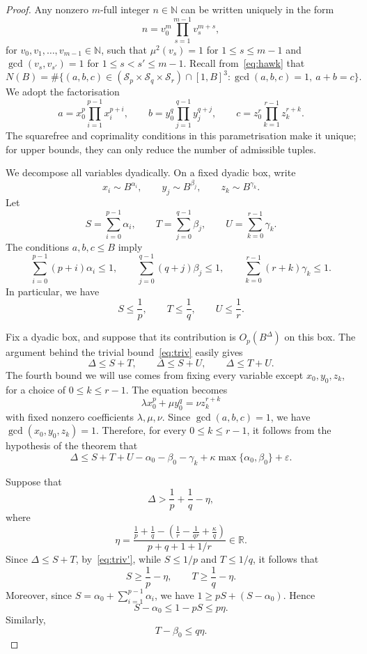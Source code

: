 \documentclass[10pt,a4paper]{amsart}
\newcommand\R{\mathbb{R}}
\renewcommand{\ge}{\geqslant}
\renewcommand{\le}{\leqslant}
\renewcommand{\leq}{\leqslant}
\newcommand\ve{\varepsilon}
\begin{document}
\begin{proof}
Any nonzero $m$-full integer $n\in \mathbb{N}$ can be written uniquely in the form
\[
n = v_0^{m} \prod_{s = 1}^{m-1} v_s^{m + s},
\]
for $v_0, v_1, \ldots, v_{m - 1} \in \mathbb{N}$, such that $\mu^2(v_s) =1$ for $1 \leq s \leq m-1$ and $\gcd(v_s, v_{s'}) = 1$ for $1 \leq s < s' \leq m-1$.
Recall 
from~\eqref{eq:hawk} that 
\[
N(B)=\#\{(a,b,c)\in (\mathcal{S}_p\times \mathcal{S}_q\times \mathcal{S}_r)\cap[1,B]^3: \gcd(a,b,c)=1,~a+b=c\}.
\]
We adopt the factorisation
\[
a=x_0^p\prod_{i=1}^{p-1}x_i^{p+i},\qquad
b=y_0^q\prod_{j=1}^{q-1}y_j^{q+j},\qquad
c=z_0^r\prod_{k=1}^{r-1}z_k^{r+k}.
\]
The squarefree and coprimality conditions in this parametrisation make it unique;
for upper bounds, they can only reduce the number of admissible tuples. 

We decompose all variables dyadically. On a fixed dyadic box, write
\[
x_i\sim B^{\alpha_i},\qquad y_j\sim B^{\beta_j},\qquad z_k\sim B^{\gamma_k}.
\]
Let
\begin{equation}\label{eq:UVW}
S=\sum_{i=0}^{p-1}\alpha_i,\qquad
T=\sum_{j=0}^{q-1}\beta_j,\qquad
U=\sum_{k=0}^{r-1}\gamma_k.
\end{equation}
The conditions $a,b,c\le B$ imply
\[
\sum_{i=0}^{p-1}(p+i)\alpha_i\le 1,\qquad
\sum_{j=0}^{q-1}(q+j)\beta_j\le 1,\qquad
\sum_{k=0}^{r-1}(r+k)\gamma_k\le 1.
\]
In particular, we have 
\[
S\le \frac1p,\qquad T\le \frac1q,\qquad U\le \frac1r.
\]

Fix a dyadic box, and suppose that its contribution is
$O_{p}(B^{\Delta})$ on this box. 
The argument behind the trivial bound~\eqref{eq:triv} easily gives
\begin{equation}\label{eq:triv'}
\Delta\le S+T,\qquad \Delta\le S+U,\qquad \Delta\le T+U.
\end{equation}
The fourth bound we will use comes from fixing every variable except $x_0,y_0,z_k$, for a choice of $0\le k\le r-1$. The equation becomes
\[
\lambda x_0^p+\mu y_0^q=\nu z_k^{r+k}
\]
with fixed nonzero coefficients $\lambda,\mu,\nu$. Since $\gcd(a,b,c)=1$, we have
$\gcd(x_0,y_0,z_k)=1$. Therefore, for every $0\le k\le r-1$, it follows from the hypothesis of the theorem that 
\begin{equation}\label{eq:4way}
\Delta
\le
S+T+U-\alpha_0-\beta_0-\gamma_k
+\kappa\max\{\alpha_0,\beta_0\}+\ve.
\end{equation}

Suppose that
\[
\Delta> \frac 1p+\frac 1q-\eta,
\]
where 
\[
\eta=
 \frac{
 \displaystyle
 \frac1p+\frac1q-
 \left(
 \frac1r-\frac1{qr}+\frac{\kappa}q
 \right)}
 {p+q+1+1/r}\in \R. 
\]
Since $\Delta\le S+T$, by~\eqref{eq:triv'}, 
while $S\le 1/p$ and $T\le 1/q$, it follows that 
\[
S\ge \frac1p-\eta,\qquad T\ge \frac1q-\eta.
\]
Moreover, since $S=\alpha_0+\sum_{i=1}^{p-1}\alpha_i$, we have
$
1\ge pS+(S-\alpha_0).
$
Hence
\begin{equation}\label{eq:Ua0}
 S-\alpha_0\le 1-pS\le p\eta.
\end{equation}
Similarly,
\begin{equation}\label{eq:Vb0}
T-\beta_0\le q\eta.
\end{equation}


\end{proof}
\end{document}
